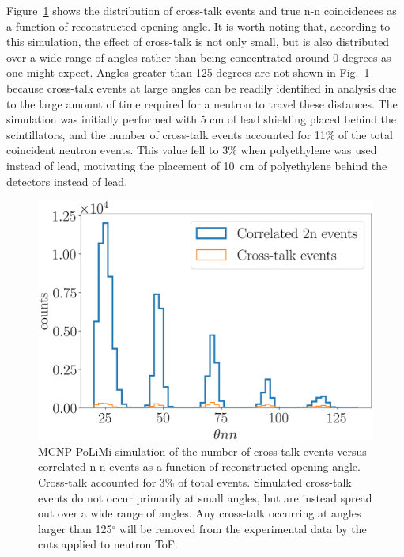 Figure~\ref{fig:CrosstalkVScoincidence} shows the distribution of cross-talk events and true n-n coincidences as a function of reconstructed opening angle.
It is worth noting that, according to this simulation, the effect of cross-talk is not only small, but is also distributed over a wide range of angles rather than being concentrated around 0 degrees as one might expect.
Angles greater than 125 degrees are not shown in Fig.~\ref{fig:CrosstalkVScoincidence} because cross-talk events at large angles can be readily identified in analysis due to the large amount of time required for a neutron to travel these distances.
The simulation was initially performed with 5 cm of lead shielding placed behind the scintillators, and the number of cross-talk events accounted for 11\% of the total coincident neutron events.
This value fell to 3\% when polyethylene was used instead of lead, motivating the placement of 10~cm of polyethylene behind the detectors instead of lead.
\begin{figure}
    \centering
    \includegraphics[width = \figsize\textwidth]{CrosstalkVScoincidence.png}
    \caption{
    MCNP-PoLiMi simulation of the number of cross-talk events versus correlated n-n events as a function of reconstructed opening angle.
    Cross-talk accounted for 3\% of total events.
    Simulated cross-talk events do not occur primarily at small angles, but are instead spread out over a wide range of angles.
    Any cross-talk occurring at angles larger than 125$^{\circ}$ will be removed from the experimental data by the cuts applied to neutron ToF.
    }
    \label{fig:CrosstalkVScoincidence}
\end{figure}

